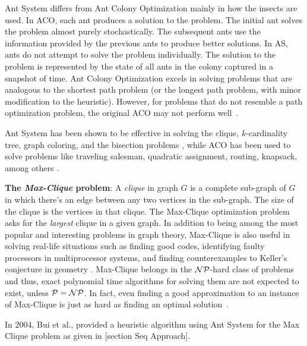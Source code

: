 \documentclass[11pt]{article}
\begin{document}
Ant System differs from Ant Colony Optimization mainly in how the insects are used. In ACO, each ant produces a solution to the problem. The initial ant solves the problem almost purely stochastically. The subsequent ants use the information provided by the previous ants to produce better solutions. In AS, ants do not attempt to solve the problem individually. The solution to the problem is represented by the state of all ants in the colony captured in a snapshot of time.  Ant Colony Optimization excels in solving problems that are analogous to the shortest path problem (or the longest path problem, with minor modification to the heuristic). However, for problems that do not resemble a path optimization problem, the original ACO may not perform well~\cite{todo}.

Ant System has been shown to be effective in solving the clique, $k$-cardinality tree, graph coloring, and the bisection problems \cite{BR, BS2, CH,BS1}, while ACO has been used to solve problems like traveling salesman, quadratic assignment, routing, knapsack, among others \cite{DG, BJ2, MC}.



\textbf{The \textit{Max-Clique} problem}: A \textit{clique} in graph $G$ is a complete sub-graph of $G$ in which there's an edge between any two vertices in the sub-graph.  The size of the clique is the vertices in that clique. The Max-Clique optimization problem asks for the \textit{largest} clique in a given graph.  In addition to being among the most popular and interesting problems in graph theory, Max-Clique is also useful in  solving real-life situations such as finding good codes, identifying faulty processors in multiprocessor systems, and finding counterexamples to Keller's conjecture in geometry \cite{BP2}\cite{Sloane}\cite{SMW}\cite{Keller}\cite{LS}.  Max-Clique belongs in the $\cal NP$-hard class of problems and thus, exact polynomial time algorithms for solving them are not expected to exist, unless $\cal P = NP$.  In fact, even finding a good approximation to an instance of Max-Clique is just as hard as finding an optimal solution~\cite{Hastad}. %

In 2004, Bui et al., provided a heuristic algorithm using Ant System for the Max Clique problem as given 
in [section Seq Approach].
\end{document}
